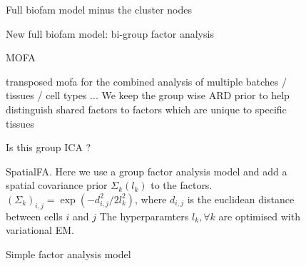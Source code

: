 \documentclass[a4paper,11pt]{article}
\begin{document}
% 	  
\begin{figure}
  \begin{center}
  	  
  \end{center}
  \caption{Full biofam model minus the cluster nodes}
\end{figure}

\begin{figure}
  \begin{center}
  	  
  \end{center}
  \caption{New full biofam model: bi-group factor analysis}
\end{figure}


% 	  

\begin{figure}
  \begin{center}
  	  
  \end{center}
  \caption{MOFA}
\end{figure}

\begin{figure}
  \begin{center}
  	  
  \end{center}
  \caption{transposed mofa for the combined analysis of multiple batches / tissues / cell types ... We keep the group wise ARD prior to help distinguish shared factors to factors which are unique to specific tissues}
\end{figure}


\begin{figure}
  \begin{center}
    
  \end{center}
  \caption {Is this group ICA ? }
\end{figure}

\begin{figure}
  \begin{center}
    
  \end{center}
  \caption{SpatialFA. Here we use a group factor analysis model and add a spatial covariance prior $\Sigma_k(l_k)$ to the factors. $\left(\Sigma_k\right)_{i,j} = \exp\left(-d_{i,j}^2/2l_k^2\right)$, where $d_{i,j}$ is the euclidean distance between cells $i$ and $j$ The hyperparamters $l_k, \forall k$ are optimised with variational EM.}
\end{figure}


\begin{figure}
  \begin{center}
    
  \end{center}
  \caption{Simple factor analysis model }
\end{figure}
\end{document}
